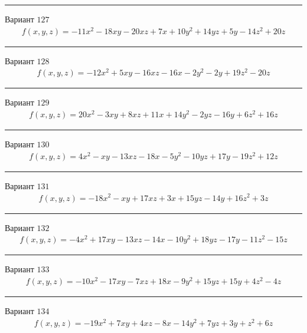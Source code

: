\documentclass[11pt]{report}
\begin{document}
\begin{center}
\noindent\rule{8cm}{0.4pt}
\end{center}
Вариант $127$
\begin{align*}
    f(x, y, z) = - 11 x^{2} - 18 x y - 20 x z + 7 x + 10 y^{2} + 14 y z + 5 y - 14 z^{2} + 20 z
\end{align*}
\begin{center}
\noindent\rule{8cm}{0.4pt}
\end{center}
Вариант $128$
\begin{align*}
    f(x, y, z) = - 12 x^{2} + 5 x y - 16 x z - 16 x - 2 y^{2} - 2 y + 19 z^{2} - 20 z
\end{align*}
\begin{center}
\noindent\rule{8cm}{0.4pt}
\end{center}
Вариант $129$
\begin{align*}
    f(x, y, z) = 20 x^{2} - 3 x y + 8 x z + 11 x + 14 y^{2} - 2 y z - 16 y + 6 z^{2} + 16 z
\end{align*}
\begin{center}
\noindent\rule{8cm}{0.4pt}
\end{center}
Вариант $130$
\begin{align*}
    f(x, y, z) = 4 x^{2} - x y - 13 x z - 18 x - 5 y^{2} - 10 y z + 17 y - 19 z^{2} + 12 z
\end{align*}
\begin{center}
\noindent\rule{8cm}{0.4pt}
\end{center}
Вариант $131$
\begin{align*}
    f(x, y, z) = - 18 x^{2} - x y + 17 x z + 3 x + 15 y z - 14 y + 16 z^{2} + 3 z
\end{align*}
\begin{center}
\noindent\rule{8cm}{0.4pt}
\end{center}
Вариант $132$
\begin{align*}
    f(x, y, z) = - 4 x^{2} + 17 x y - 13 x z - 14 x - 10 y^{2} + 18 y z - 17 y - 11 z^{2} - 15 z
\end{align*}
\begin{center}
\noindent\rule{8cm}{0.4pt}
\end{center}
Вариант $133$
\begin{align*}
    f(x, y, z) = - 10 x^{2} - 17 x y - 7 x z + 18 x - 9 y^{2} + 15 y z + 15 y + 4 z^{2} - 4 z
\end{align*}
\begin{center}
\noindent\rule{8cm}{0.4pt}
\end{center}
Вариант $134$
\begin{align*}
    f(x, y, z) = - 19 x^{2} + 7 x y + 4 x z - 8 x - 14 y^{2} + 7 y z + 3 y + z^{2} + 6 z
\end{align*}
\end{document}
